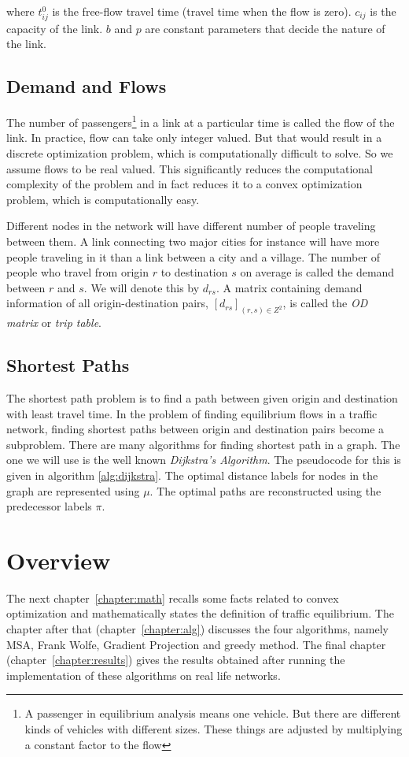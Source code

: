 where $t^0_{ij}$ is the free-flow travel time (travel time when the flow is zero). $c_{ij}$ is the capacity of the link. $b$ and $p$ are constant parameters that decide the nature of the link.

\subsection{Demand and Flows}
The number of passengers\footnote{A passenger in equilibrium analysis means one vehicle. But there are different kinds of vehicles	with different sizes. These things are adjusted by multiplying a constant factor to the flow} in a link at a particular time	is called the flow of the link. In practice, flow can take only integer valued. But that would result in a discrete optimization problem, which is computationally difficult to solve. So we assume flows to be real valued. This significantly reduces the computational	complexity of the problem and in fact reduces it to a convex optimization problem, which is computationally easy.

Different nodes in the network will have different number of people traveling between them. A link connecting two major cities for instance will have more people traveling in it	than a link between a city and a village. The number of people who travel from origin $r$ to destination $s$ on average is called the demand between $r$ and $s$. We will denote this by $d_{rs}$. A matrix containing demand information of all origin-destination pairs,
 $[d_{rs}]_{(r,s)\in Z^2}$,
is called the \emph{OD matrix} or \emph{trip table}.


\subsection{Shortest Paths}
The shortest path problem is to find a path between given origin and destination with least travel time. In the problem of finding equilibrium flows in a traffic network, finding shortest paths between origin and destination pairs become a subproblem. There are many algorithms for finding shortest path in a graph. The one we will use is the well known \emph{Dijkstra's Algorithm}. The pseudocode for this is given in algorithm \ref{alg:dijkstra}. The optimal distance labels for nodes in the graph are represented using $\mu$. The optimal paths are reconstructed using the predecessor labels $\pi$.
	


\section{Overview}
The next chapter~\ref{chapter:math} recalls some facts
related to convex optimization and mathematically states the definition of traffic equilibrium.
The chapter after that (chapter~\ref{chapter:alg}) discusses the four algorithms, namely MSA, Frank Wolfe, Gradient Projection and greedy method. The final chapter (chapter~\ref{chapter:results}) gives the results obtained after running the implementation of
these algorithms on real life networks.
